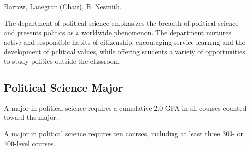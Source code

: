 \documentclass[
  letterpaper,
]{scrbook}
\begin{document}
Barrow, Lanegran (Chair), B. Nesmith.

The department of political science emphasizes the breadth of political
science and presents politics as a worldwide phenomenon. The department
nurtures active and responsible habits of citizenship, encouraging
service learning and the development of political values, while offering
students a variety of opportunities to study politics outside the
classroom.

\subsection{Political Science Major}\label{political-science-major}

A major in political science requires a cumulative 2.0 GPA in all
courses counted toward the major.

A major in political science requires ten courses, including at least
three 300- or 400-level courses.
\end{document}
